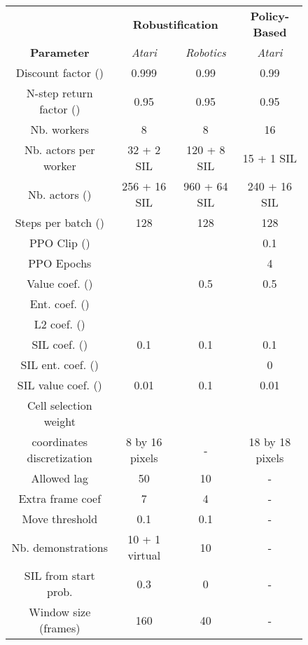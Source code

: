 \documentclass{nature}
\begin{document}
\FloatBarrier

\begin{table}[ht!]
    \centering
    \fontsize{9}{10.5}\selectfont
    \begin{subfigure}[]{0.8\textwidth}
        \centering
        \begin{tabular}{c|cc|c}
            & \multicolumn{2}{c|}{\textbf{Robustification}} & \textbf{Policy-Based}\\ 
            \textbf{Parameter} & \emph{Atari} & \emph{Robotics} & \emph{Atari} \\
            \hline
            Discount factor () & 0.999  & 0.99 & 0.99 \\
            N-step return factor () & 0.95 & 0.95 & 0.95\\
            Nb. workers & 8 & 8 & 16\\
            Nb. actors per worker & 32 + 2 SIL & 120 + 8 SIL & 15 + 1 SIL\\
            Nb. actors () & 256 + 16 SIL & 960 + 64 SIL & 240 + 16 SIL\\
            Steps per batch () & 128 & 128 & 128 \\
            PPO Clip () &  &  & 0.1\\
            PPO Epochs &  &  & 4\\
            Value coef. () &  & 0.5 & 0.5\\
            Ent. coef. () &  &  & \\
            L2 coef. () &  &  & \\
            SIL coef. () & 0.1 & 0.1 & 0.1 \\
            SIL ent. coef. () &  &  & 0\\
            SIL value coef. () & 0.01 & 0.1 & 0.01\\
            Cell selection weight &  &  & \\
             coordinates discretization & 8 by 16 pixels & - & 18 by 18 pixels \\
            \hline
            Allowed lag & 50 & 10 & - \\
            Extra frame coef & 7 & 4 & -\\
            Move threshold & 0.1 & 0.1 & -\\
            Nb. demonstrations & 10 + 1 virtual & 10 & -\\
            SIL from start prob. & 0.3 & 0 & -\\
            Window size (frames) & 160 & 40 & -\\

\end{tabular}
\end{subfigure}
\end{table}
\end{document}
